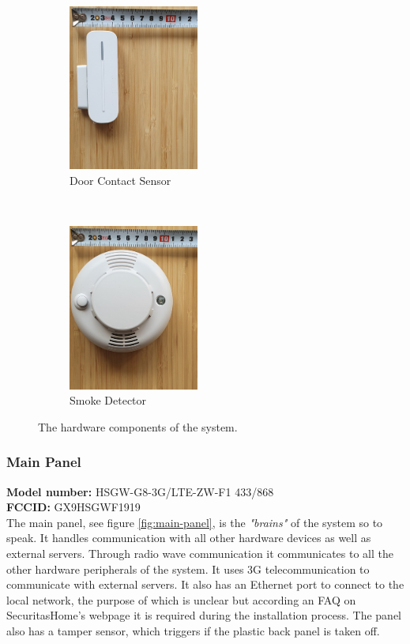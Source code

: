 \begin{figure}[!ht]
    \begin{subfigure}[t]{0.33\textwidth}
        \includegraphics[height=2.15in]{images/3-system/door-contact.png}
        \caption{Door Contact Sensor}
        \label{fig:door-contact}
    \end{subfigure}%
    ~
    \begin{subfigure}[t]{0.33\textwidth}
        \includegraphics[height=2.15in]{images/3-system/smoke-detector.png}
        \caption{Smoke Detector}
        \label{fig:smoke-detector}
    \end{subfigure}
    \caption{The hardware components of the system.}
    \label{fig:hardware-components}
\end{figure}
\subsubsection{Main Panel}
\textbf{Model number:} HSGW-G8-3G/LTE-ZW-F1 433/868 \\
\textbf{FCCID:} GX9HSGWF1919 \\
The main panel, see figure \ref{fig:main-panel}, is the \textit{"brains"} of the system so to speak. It handles communication with all other hardware devices as well as external servers. Through radio wave communication it communicates to all the other hardware peripherals of the system. It uses 3G telecommunication to communicate with external servers. It also has an Ethernet port to connect to the local network, the purpose of which is unclear but according an FAQ on SecuritasHome's webpage it is required during the installation process. The panel also has a tamper sensor, which triggers if the plastic back panel is taken off.

